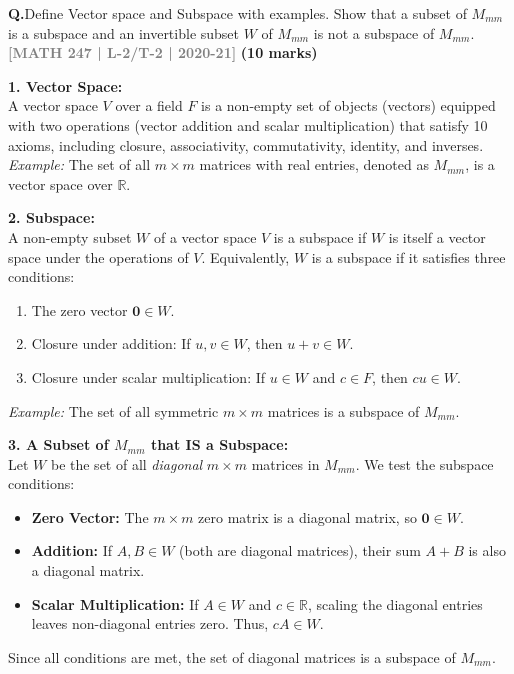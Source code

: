 \documentclass[12pt,a3paper]{article}
\newcommand{\yr}[1]{\hfill\textcolor{gray}{\small\textbf{[#1]}}}
\newcommand{\mk}[1]{\textcolor{orange!70!black}{\small\textbf{(#1 marks)}}}
\newcounter{qnum}
\newcommand{\Q}[1]{%
  \needspace{4\baselineskip}
  \refstepcounter{qnum}
  \vspace{6pt}
  \noindent\textbf{Q\theqnum.}\enspace #1\par
}
\begin{document}
\Q{Define Vector space and Subspace with examples. Show that a subset of $M_{mm}$ is a subspace and an invertible subset $W$ of $M_{mm}$ is not a subspace of $M_{mm}$.
\yr{MATH 247 | L-2/T-2 | 2020-21} \mk{10}}

\begin{tcolorbox}[enhanced,breakable,
  colback=cC!4,colframe=cC,boxrule=0.8pt,arc=5pt,
  title={\textbf{Answer --- Q118: Vector Space, Subspace \& Subsets of $M_{mm}$}},
  fonttitle=\bfseries\color{white},colbacktitle=cC]

\textbf{1. Vector Space:} \\
A vector space $V$ over a field $F$ is a non-empty set of objects (vectors) equipped with two operations (vector addition and scalar multiplication) that satisfy 10 axioms, including closure, associativity, commutativity, identity, and inverses. \\
\textit{Example:} The set of all $m \times m$ matrices with real entries, denoted as $M_{mm}$, is a vector space over $\mathbb{R}$.

\vspace{3mm}
\textbf{2. Subspace:} \\
A non-empty subset $W$ of a vector space $V$ is a subspace if $W$ is itself a vector space under the operations of $V$. Equivalently, $W$ is a subspace if it satisfies three conditions:
\begin{enumerate}
    \item The zero vector $\mathbf{0} \in W$.
    \item Closure under addition: If $u, v \in W$, then $u + v \in W$.
    \item Closure under scalar multiplication: If $u \in W$ and $c \in F$, then $cu \in W$.
\end{enumerate}
\textit{Example:} The set of all symmetric $m \times m$ matrices is a subspace of $M_{mm}$.

\vspace{3mm}
\textbf{3. A Subset of $M_{mm}$ that IS a Subspace:} \\
Let $W$ be the set of all \textit{diagonal} $m \times m$ matrices in $M_{mm}$. We test the subspace conditions:
\begin{itemize}
    \item \textbf{Zero Vector:} The $m \times m$ zero matrix is a diagonal matrix, so $\mathbf{0} \in W$.
    \item \textbf{Addition:} If $A, B \in W$ (both are diagonal matrices), their sum $A + B$ is also a diagonal matrix.
    \item \textbf{Scalar Multiplication:} If $A \in W$ and $c \in \mathbb{R}$, scaling the diagonal entries leaves non-diagonal entries zero. Thus, $cA \in W$.
\end{itemize}
Since all conditions are met, the set of diagonal matrices is a subspace of $M_{mm}$.


\end{tcolorbox}
\end{document}
